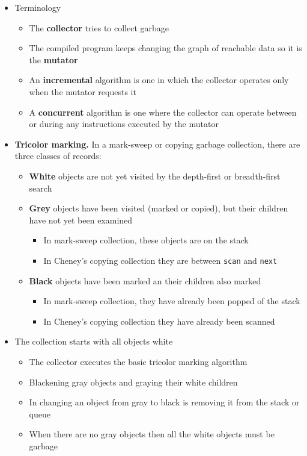 \documentclass[11pt]{article}
\begin{document}
\begin{itemize}
\item Terminology
\begin{itemize}
\item The \textbf{collector} tries to collect garbage
\item The compiled program keeps changing the graph of reachable data so it is the \textbf{mutator}
\item An \textbf{incremental} algorithm is one in which the collector operates only when the mutator requests it
\item A \textbf{concurrent} algorithm is one where the collector can operate between or during any instructions executed by the mutator
\end{itemize}

\item \textbf{Tricolor marking.} In a mark-sweep or copying garbage collection, there are three classes of records:
\begin{itemize}
\item \textbf{White} objects are not yet visited by the depth-first or breadth-first search
\item \textbf{Grey} objects have been visited (marked or copied), but their children have not yet been examined
\begin{itemize}
\item In mark-sweep collection, these objects are on the stack
\item In Cheney's copying collection they are between \texttt{scan} and \texttt{next}
\end{itemize}
\item \textbf{Black} objects have been marked an their children also marked
\begin{itemize}
\item In mark-sweep collection, they have already been popped of the stack
\item In Cheney's copying collection they have already been scanned
\end{itemize}
\end{itemize}

\item The collection starts with all objects white
\begin{itemize}
\item The collector executes the basic tricolor marking algorithm
\item Blackening gray objects and graying their white children
\item In changing an object from gray to black is removing it from the stack or queue
\item When there are no gray objects then all the white objects must be garbage
\end{itemize}


\end{itemize}
\end{document}
